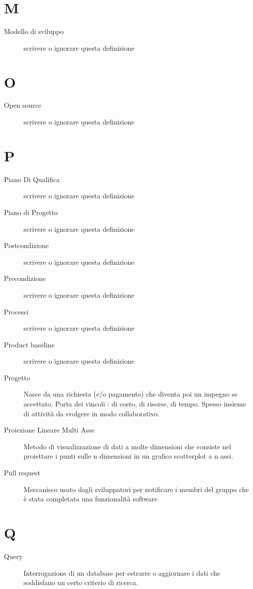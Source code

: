 \documentclass{article}
\begin{document}
\section{M}
\begin{description}
  \item[Modello di sviluppo] {scrivere o ignorare questa definizione}
\end{description}
\newpage
\section{O}
\begin{description}
  \item[Open source] {scrivere o ignorare questa definizione}
\end{description}
\newpage
\section{P}
\begin{description}
  \item[Piano Di Qualifica] {scrivere o ignorare questa definizione}
  \item[Piano di Progetto] {scrivere o ignorare questa definizione}
  \item[Postcondizione] {scrivere o ignorare questa definizione}
  \item[Precondizione] {scrivere o ignorare questa definizione}
  \item[Processi] {scrivere o ignorare questa definizione}
  \item[Product baseline] {scrivere o ignorare questa definizione}
  \item[Progetto] Nasce da una richiesta (e/o pagamento) che diventa poi un impegno se accettato. Porta dei vincoli : di costo, di risorse, di tempo. Spesso insieme di attività da svolgere in modo collaborativo.
  \item[Proiezione Lineare Multi Asse] Metodo di visualizzazione di dati a molte dimensioni che consiste nel proiettare i punti sulle n dimensioni in un grafico scatterplot a n assi. 
  \item[Pull request] Meccanisco usato dagli sviluppatori per notificare i membri del gruppo che è stata completata una funzionalità software
\end{description}
\newpage
\section{Q}
\begin{description}
  \item[Query] Interrogazione di un database per estrarre o aggiornare i dati che soddisfano un certo criterio di ricerca.
\end{description}
\newpage
\end{document}
